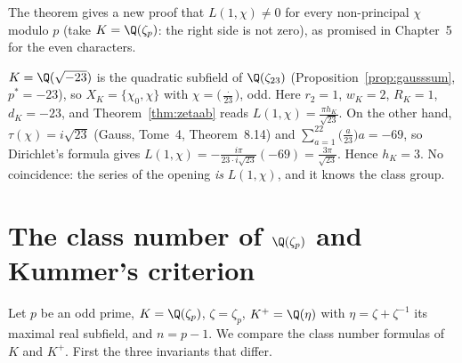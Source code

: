 The theorem gives a new proof that $L(1,\chi)\ne0$ for every non-principal $\chi$ modulo $p$ (take $K=\Q(\zeta_p)$: the right side is
not zero), as promised in Chapter~5 for the even characters.

\begin{example}\label{exa:h23}
$K=\Q(\sqrt{-23})$ is the quadratic subfield of $\Q(\zeta_{23})$ (Proposition~\ref{prop:gausssum}, $p^*=-23$), so $X_K=\{\chi_0,\chi\}$ with
$\chi=\bigl(\frac\cdot{23}\bigr)$, odd. Here $r_2=1$, $w_K=2$, $R_K=1$, $d_K=-23$, and Theorem~\ref{thm:zetaab} reads $L(1,\chi)=\frac{\pi h_K}
{\sqrt{23}}$. On the other hand, $\tau(\chi)=i\sqrt{23}$ (Gauss, Tome~4, Theorem~8.14) and $\sum_{a=1}^{22}\bigl(\frac a{23}\bigr)a=-69$,
so Dirichlet's formula gives $L(1,\chi)=-\frac{i\pi}{23\cdot i\sqrt{23}}(-69)=\frac{3\pi}{\sqrt{23}}$. Hence $h_K=3$. No coincidence:
the series of the opening \emph{is} $L(1,\chi)$, and it knows the class group.
\end{example}

\section{The class number of \texorpdfstring{$\Q(\zeta_p)$}{Q(zeta p)} and Kummer's criterion}

Let $p$ be an odd prime, $K=\Q(\zeta_p)$, $\zeta=\zeta_p$, $K^+=\Q(\eta)$ with $\eta=\zeta+\zeta^{-1}$ its maximal real subfield, and $n=p-1$.
We compare the class number formulas of $K$ and $K^+$. First the three invariants that differ.

